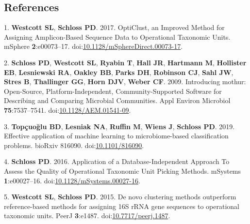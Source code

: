 \documentclass[
  11pt,
]{article}
\newenvironment{cslreferences}%
  {}%
  {\par}
\begin{document}
\hypertarget{references}{%
\subsection*{References}\label{references}}

\hypertarget{refs}{}
\begin{cslreferences}
\leavevmode\hypertarget{ref-westcott_opticlust_2017}{}%
1. \textbf{Westcott SL}, \textbf{Schloss PD}. 2017. OptiClust, an
Improved Method for Assigning Amplicon-Based Sequence Data to
Operational Taxonomic Units. mSphere \textbf{2}:e00073--17.
doi:\href{https://doi.org/10.1128/mSphereDirect.00073-17}{10.1128/mSphereDirect.00073-17}.

\leavevmode\hypertarget{ref-schloss_introducing_2009}{}%
2. \textbf{Schloss PD}, \textbf{Westcott SL}, \textbf{Ryabin T},
\textbf{Hall JR}, \textbf{Hartmann M}, \textbf{Hollister EB},
\textbf{Lesniewski RA}, \textbf{Oakley BB}, \textbf{Parks DH},
\textbf{Robinson CJ}, \textbf{Sahl JW}, \textbf{Stres B},
\textbf{Thallinger GG}, \textbf{Horn DJV}, \textbf{Weber CF}. 2009.
Introducing mothur: Open-Source, Platform-Independent,
Community-Supported Software for Describing and Comparing Microbial
Communities. Appl Environ Microbiol \textbf{75}:7537--7541.
doi:\href{https://doi.org/10.1128/AEM.01541-09}{10.1128/AEM.01541-09}.

\leavevmode\hypertarget{ref-topcuoglu_effective_2019}{}%
3. \textbf{Topçuoğlu BD}, \textbf{Lesniak NA}, \textbf{Ruffin M},
\textbf{Wiens J}, \textbf{Schloss PD}. 2019. Effective application of
machine learning to microbiome-based classification problems. bioRxiv
816090. doi:\href{https://doi.org/10.1101/816090}{10.1101/816090}.

\leavevmode\hypertarget{ref-schloss_application_2016}{}%
4. \textbf{Schloss PD}. 2016. Application of a Database-Independent
Approach To Assess the Quality of Operational Taxonomic Unit Picking
Methods. mSystems \textbf{1}:e00027--16.
doi:\href{https://doi.org/10.1128/mSystems.00027-16}{10.1128/mSystems.00027-16}.

\leavevmode\hypertarget{ref-westcott_novo_2015}{}%
5. \textbf{Westcott SL}, \textbf{Schloss PD}. 2015. De novo clustering
methods outperform reference-based methods for assigning 16S rRNA gene
sequences to operational taxonomic units. PeerJ \textbf{3}:e1487.
doi:\href{https://doi.org/10.7717/peerj.1487}{10.7717/peerj.1487}.
\end{cslreferences}
\end{document}

